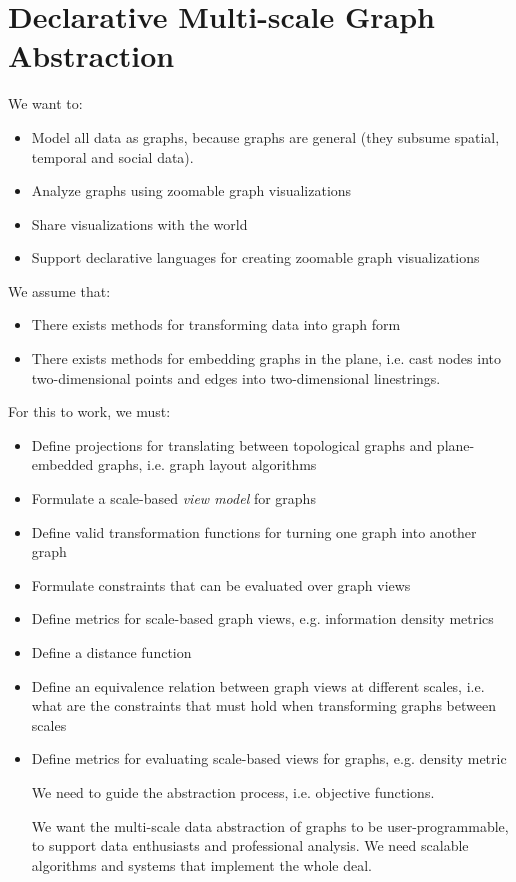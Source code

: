\chapter{Declarative Multi-scale Graph Abstraction}

We want to:
\begin{itemize}
\item Model all data as graphs, because graphs are general (they subsume spatial, temporal and social data). 
\item Analyze graphs using zoomable graph visualizations
\item Share visualizations with the world
\item Support declarative languages for creating zoomable graph visualizations
\end{itemize}

We assume that:

\begin{itemize}
\item There exists methods for transforming data into graph form
\item There exists methods for embedding graphs in the plane, i.e. cast nodes into two-dimensional points and edges into two-dimensional linestrings. 
\end{itemize}

For this to work, we must:
\begin{itemize}
\item Define projections for translating between topological graphs and plane-embedded graphs, i.e. graph layout algorithms
\item Formulate a scale-based \emph{view model} for graphs

\item Define valid transformation functions for turning one graph into another graph
\item Formulate constraints that can be evaluated over graph views
\item Define metrics for scale-based graph views, e.g. information density metrics
\item Define a distance function 
\item Define an equivalence relation between graph views at different scales, i.e. what are the constraints that must hold when transforming graphs between scales

\item Define metrics for evaluating scale-based views for graphs, e.g. density metric


We need to guide the abstraction process, i.e. objective functions. 

We want the multi-scale data abstraction of graphs to be user-programmable, to support data enthusiasts and professional analysis. We need scalable algorithms and systems that implement the whole deal.

\end{itemize}

